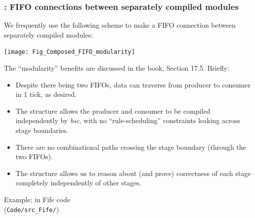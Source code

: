 \begin{frame}[fragile]
\frametitle{{\BSV}: FIFO connections between separately compiled modules}

\footnotesize

\begin{minipage}{0.34\textwidth}
We frequently use the following scheme to make a FIFO connection
between separately compiled modules:
\end{minipage}
\hfill
\begin{minipage}{0.64\textwidth}
\texttt{[image: Fig\_Composed\_FIFO\_modularity]}
\end{minipage}

\PAUSE{\vspace{2ex}}

The ``modularity'' benefits are discussed in the book, Section 17.5.  Briefly:

\begin{itemize}

 \item Despite there being two FIFOs, data can traverse from producer
       to consumer in 1 tick, as desired.

 \item The structure allows the producer and consumer to be compiled
       independently by \emph{bsc}, with no ``rule-scheduling''
       constraints leaking across stage boundaries.

 \item There are no combinational paths crossing the stage boundary
       (through the two FIFOs).

 \item The structure allows us to reason about (and prove) correctness
       of each stage completely independently of other stages.

\end{itemize}

\begin{minipage}{0.2\textwidth}
 Example: in Fife code \\
 ({\tt Code/src\_Fife/})
\end{minipage}
\end{frame}
